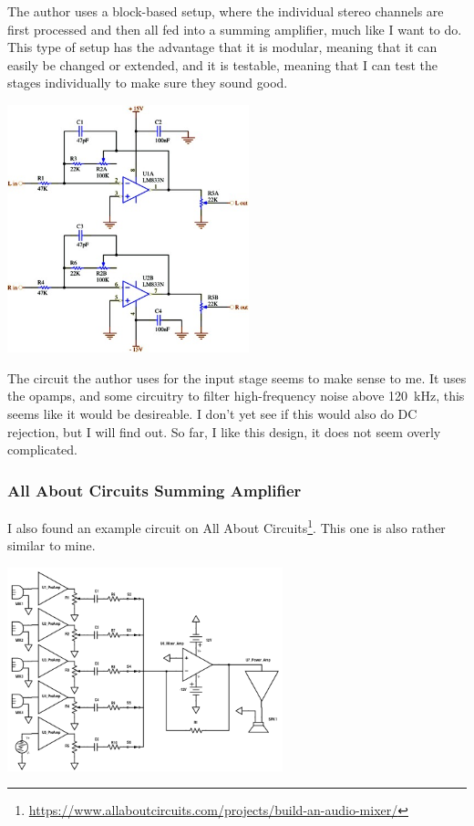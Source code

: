 \documentclass[a4paper]{article}
\begin{document}
The author uses a block-based setup, where the individual stereo channels are first processed and then all fed into a summing amplifier, much like I want to do.  This type of setup has the advantage that it is modular, meaning that it can easily be changed or extended, and it is testable, meaning that I can test the stages individually to make sure they sound good.

\begin{center}
  \includegraphics[width=7cm]{images/f3_audio_mixer}
\end{center}

The circuit the author uses for the input stage seems to make sense to me. It uses the opamps, and some circuitry to filter high-frequency noise above \SI{120}{\kilo\hertz}, this seems like it would be desireable. I don't yet see if this would also do DC rejection, but I will find out. So far, I like this design, it does not seem overly complicated.

\subsubsection{All About Circuits Summing Amplifier}

I also found an example circuit on All About Circuits\footnote{\url{https://www.allaboutcircuits.com/projects/build-an-audio-mixer/}}. This one is also rather similar to mine.

\begin{center}
  \includegraphics[width=8cm]{images/Audio-Mixer_8-5-2015}
\end{center}
\end{document}
